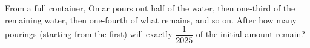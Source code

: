 From a full container, Omar pours out half of the water, then one-third of the remaining water, then one-fourth of what remains, and so on. After how many pourings (starting from the first) will exactly $\dfrac{1}{2025}$ of the initial amount remain?
